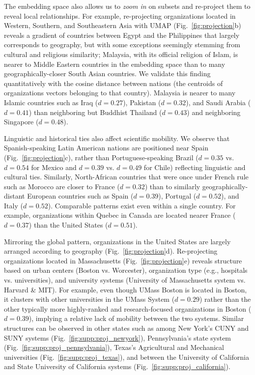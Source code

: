 \documentclass[12pt]{article} %
\begin{document}
The embedding space also allows us to \textit{zoom in} on subsets and re-project them to reveal local relationships.
For example, re-projecting organizations located in Western, Southern, and Southeastern Asia with UMAP (Fig.~\ref{fig:projection}b) reveals a gradient of countries between Egypt and the Philippines that largely corresponds to geography, but with some exceptions seemingly stemming from cultural and religious similarity;
Malaysia, with its official religion of Islam, is nearer to Middle Eastern countries in the embedding space than to many geographically-closer South Asian countries.
We validate this finding quantitatively with the cosine distance between nations (the centroids of organizations vectors belonging to that country).
Malaysia is nearer to many Islamic countries such as Iraq ($d = 0.27$), Pakistan ($d = 0.32$), and Saudi Arabia ($d = 0.41$)  than neighboring but Buddhist Thailand ($d = 0.43$) and neighboring Singapore ($d = 0.48$).

Linguistic and historical ties also affect scientific mobility.
We observe that Spanish-speaking Latin American nations are positioned near Spain (Fig.~\ref{fig:projection}c), rather than Portuguese-speaking Brazil ($d = 0.35$ vs. $d = 0.54$ for Mexico and $d = 0.39$ vs. $d = 0.49$ for Chile) reflecting linguistic and cultural ties.
Similarly, North-African countries that were once under French rule such as Morocco are closer to France ($d =0.32$) than to similarly geographically-distant European countries such as Spain ($d = 0.39$), Portugal ($d = 0.52$), and Italy ($d = 0.52$).
Comparable patterns exist even within a single country.
For example, organizations within Quebec in Canada are located nearer France ($d = 0.37$) than the United States ($d = 0.51$).


Mirroring the global pattern, organizations in the United States are largely arranged according to geography (Fig.~\ref{fig:projection}d).
Re-projecting organizations located in Massachusetts (Fig.~\ref{fig:projection}e) reveals structure based on urban centers (Boston vs. Worcester), organization type (e.g., hospitals vs. universities), and university systems (University of  Massachusetts system vs. Harvard \& MIT).
For example, even though UMass Boston is located in Boston, it clusters with other universities in the UMass System ($d = 0.29$) rather than the other typically more highly-ranked and research-focused organizations in Boston ($d = 0.39$), implying a relative lack of mobility between the two systems.
Similar structures can be observed in other states such as among New York's CUNY and SUNY systems (Fig.~\ref{fig:supp:proj_newyork}), Pennsylvania's state system (Fig.~\ref{fig:supp:proj_pennsylvania}), Texas's Agricultural and Mechanical universities (Fig.~\ref{fig:supp:proj_texas}), and between the University of California and State University of California systems (Fig.~\ref{fig:supp:proj_california}).
\end{document}
